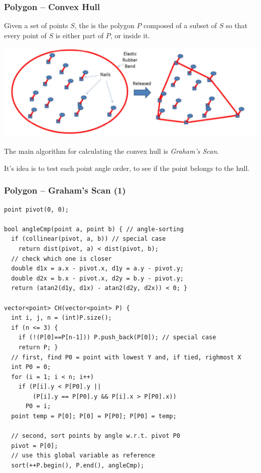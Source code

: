 \documentclass{beamer}
\begin{document}
\begin{frame}
  \frametitle{Polygon -- Convex Hull}
  {\smaller
    \begin{block}{}
      Given a set of points $S$, the  is the
      polygon $P$ composed of a subset of $S$ so that every point of
      $S$ is either part of $P$, or inside it.
    \end{block}


    \begin{center}
      \includegraphics[width=.8\textwidth]{../img/convexhull_halim}
    \end{center}


    \begin{block}{}
      The main algorithm for calculating the convex hull is
      \emph{Graham's Scan}. 

      \medskip
      
      It's idea is to test each point angle order, to see if the point
      belongs to the hull.
    \end{block}
  }
\end{frame}

\begin{frame}
  \frametitle{Polygon -- Graham's Scan (1)}

{\tiny 
\begin{exampleblock}{}
\begin{verbatim}
point pivot(0, 0);

bool angleCmp(point a, point b) { // angle-sorting
  if (collinear(pivot, a, b)) // special case
    return dist(pivot, a) < dist(pivot, b);
  // check which one is closer
  double d1x = a.x - pivot.x, d1y = a.y - pivot.y;
  double d2x = b.x - pivot.x, d2y = b.y - pivot.y;
  return (atan2(d1y, d1x) - atan2(d2y, d2x)) < 0; }

vector<point> CH(vector<point> P) {
  int i, j, n = (int)P.size();
  if (n <= 3) {
    if (!(P[0]==P[n-1])) P.push_back(P[0]); // special case
    return P; }
  // first, find P0 = point with lowest Y and, if tied, righmost X
  int P0 = 0;
  for (i = 1; i < n; i++)
    if (P[i].y < P[P0].y || 
        (P[i].y == P[P0].y && P[i].x > P[P0].x))
      P0 = i;
  point temp = P[0]; P[0] = P[P0]; P[P0] = temp;

  // second, sort points by angle w.r.t. pivot P0
  pivot = P[0];
  // use this global variable as reference
  sort(++P.begin(), P.end(), angleCmp);
\end{verbatim}
\end{exampleblock}}
\end{frame}
\end{document}
